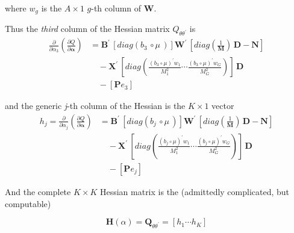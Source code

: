 \documentclass{article}
\begin{document}
where $w_g$ is the $A \times 1$ $g$-th column of $\mathbf{W}$.

\newcommand{\Xderiv}[1]{
\boldsymbol{B}^\prime\,
\left[ diag
\left(
b_{{#1}} 
\, \circ \mu \,
\right) 
\right] 
\boldsymbol{W}^\prime
}

\newcommand{\diaginvMderiv}[1]{
diag \left(
\frac{(b_{#1} \circ \mu)^\prime  w_1}{M_1^2}
\cdots
\frac{(b_{#1} \circ \mu)^\prime  w_G}{M_G^2}
\right)
} 


Thus the \textit{third} column of the Hessian matrix $Q_{\theta \theta^\prime}$ is
\begin{equation}
\begin{aligned}
  \frac{\partial}{\partial \alpha_3}
  \left( \frac{\partial Q}{\partial\boldsymbol{\alpha}} \right)
&=  \Xderiv{3} \, \left[ 
diag( \frac{1}{\boldsymbol{M}} 
) \,  \boldsymbol{D} - \boldsymbol{N} \right] \\
&\quad -
 \boldsymbol{X}^\prime \, 
 \left[  \diaginvMderiv{3}  \right] \, 
 \boldsymbol{D} \\
&\quad - \left[ 
\boldsymbol{P} e_3  \right]
\end{aligned}  \label{eq:third-col-of-hessian}
\end{equation}

and the generic  \textit{j}-th column of the Hessian is the $K \times 1$ vector
\begin{equation}
\begin{aligned}
h_j = 
  \frac{\partial}{\partial \alpha_j}
  \left( \frac{\partial Q}{\partial\boldsymbol{\alpha}} \right)
&=  \Xderiv{j} \, \left[ 
diag( \frac{1}{\boldsymbol{M}} 
) \,  \boldsymbol{D} - \boldsymbol{N} \right] \\
&\quad -
 \boldsymbol{X}^\prime \, 
 \left[  \diaginvMderiv{j}  \right] \, 
 \boldsymbol{D} \\
&\quad - \left[ 
\boldsymbol{P} e_j  \right]
\end{aligned}  \label{eq:jth-col-of-hessian}
\end{equation}

\noindent And the complete $K \times K$ Hessian matrix is the (admittedly complicated, but computable) 

\begin{equation}
\mathbf{H}(\alpha) = \mathbf{Q}_{\theta \theta^\prime} =
\left[ 
h_1 \cdots h_K
\right]
\label{eq:Hessian}
\end{equation}
\end{document}
